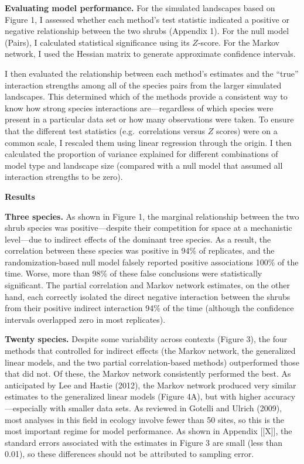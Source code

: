 \documentclass[12pt,]{article}
\begin{document}
\begin{spacing}{1.9}
\begin{flushleft}
\noindent \textbf{Evaluating model performance.} For the simulated
landscapes based on Figure 1, I assessed whether each method's test
statistic indicated a positive or negative relationship between the two
shrubs (Appendix 1). For the null model (Pairs), I calculated
statistical significance using its \(Z\)-score. For the Markov network,
I used the Hessian matrix to generate approximate confidence intervals.

I then evaluated the relationship between each method's estimates and
the ``true'' interaction strengths among all of the species pairs from
the larger simulated landscapes. This determined which of the methods
provide a consistent way to know how strong species interactions
are---regardless of which species were present in a particular data set
or how many observations were taken. To ensure that the different test
statistics (e.g.~correlations versus \(Z\) scores) were on a common
scale, I rescaled them using linear regression through the origin. I
then calculated the proportion of variance explained for different
combinations of model type and landscape size (compared with a null
model that assumed all interaction strengths to be zero).

\noindent
\textbf{Results}

\noindent \textbf{Three species.} As shown in Figure 1, the marginal
relationship between the two shrub species was positive---despite their
competition for space at a mechanistic level---due to indirect effects
of the dominant tree species. As a result, the correlation between these
species was positive in 94\% of replicates, and the randomization-based
null model falsely reported positive associations 100\% of the time.
Worse, more than 98\% of these false conclusions were statistically
significant. The partial correlation and Markov network estimates, on
the other hand, each correctly isolated the direct negative interaction
between the shrubs from their positive indirect interaction 94\% of the
time (although the confidence intervals overlapped zero in most
replicates).

\noindent
\textbf{Twenty species.} Despite some variability across contexts
(Figure 3), the four methods that controlled for indirect effects (the
Markov network, the generalized linear models, and the two partial
correlation-based methods) outperformed those that did not. Of these,
the Markov network consistently performed the best. As anticipated by
Lee and Hastie (2012), the Markov network produced very similar
estimates to the generalized linear models (Figure 4A), but with higher
accuracy---especially with smaller data sets. As reviewed in Gotelli and
Ulrich (2009), most analyses in this field in ecology involve fewer than
50 sites, so this is the most important regime for model performance. As
shown in Appendix {[}{[}X{]}{]}, the standard errors associated with the
estimates in Figure 3 are small (less than 0.01), so these differences
should not be attributed to sampling error.


\end{flushleft}
\end{spacing}
\end{document}
